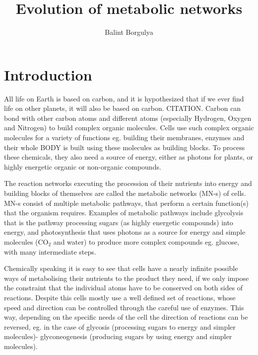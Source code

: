\documentclass[10pt,a4paper]{article}
\title{Evolution of metabolic networks}
\author{Balint Borgulya}
\begin{document}
	
	
	
	\maketitle
	
	\begin{abstract}
		
	\end{abstract}
	
	\section{Introduction}

	All life on Earth is based on carbon, and it is hypothesized that if we ever find life on other planets, it will also be based on carbon. CITATION. Carbon can bond with other carbon atoms and different atoms (especially Hydrogen, Oxygen and Nitrogen) to build complex organic molecules. Cells use such complex organic molecules for a variety of functions eg. building their membranes, enzymes and their whole BODY is built using these molecules as building blocks. To process these chemicals, they also need a source of energy, either as photons for plants, or highly energetic organic or non-organic compounds. 

	The reaction networks executing the procession of their nutrients into energy and building blocks of themselves are called the metabolic networks (MN-s) of cells.  MN-s consist of multiple metabolic pathways, that perform a certain function(s) that the organism requires. Examples of metabolic pathways include glycolysis that is the pathway processing sugars (as highly energetic compounds) into energy,  and photosynthesis that uses photons as a source for energy and simple molecules (CO$_2$ and water) to produce more complex compounds eg. glucose, with many intermediate steps. 
	
	Chemically speaking it is easy to see that cells have  a nearly infinite possible ways of metabolising their nutrients to the product they need, if we only impose the constraint that the individual atoms have to be conserved on both sides of reactions.  Despite this cells mostly use a well defined set of reactions, whose speed and direction can be controlled through the careful use of enzymes. This way, depending on the specific needs of the cell the direction of reactions can be reversed, eg. in the case of glycosis (processing sugars to energy and simpler molecules)- glyconeogenesis (producing sugars by using energy and simpler molecules). 
	
\end{document}
